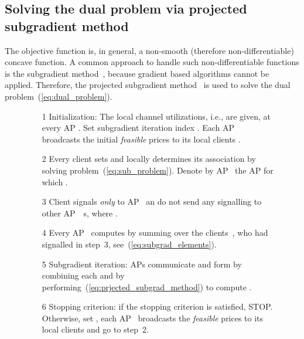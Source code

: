 \documentclass[journal, 10pt, twocolumn]{IEEEtran}
\begin{document}
\subsection{Solving the dual problem via projected subgradient method}\label{subsec:soln}
The objective function  is, in general, a non-smooth (therefore non-differentiable) concave function. A common approach to handle such non-differentiable functions is the subgradient method~\cite{Boyd-EE364b-SubGradMethods-07}, because gradient based algorithms cannot be applied. Therefore, the projected subgradient method~\cite{Bertsekas-99,Boyd-EE364b-SubGradMethods-07} is used to solve the dual problem~(\ref{eq:dual_problem}).

\begin{figure}[t]
\noindent {}
\begin{enumerate}
\scriptsize
\item[1] Initialization: The local channel utilizations, i.e.,  are given, at every AP . Set subgradient iteration index . Each AP~ broadcasts the initial \emph{feasible} prices  to its local clients .


\item[2] Every client  sets  and locally determines its association by solving problem~(\ref{eq:sub_problem}). Denote by AP~ the AP for which . 

\item[3] Client  signals \emph{only} to AP~ an do not send any signalling to other AP~~s, where .

\item[4] Every AP~ computes  by summing  over the clients~, who had signalled in step~3, see~(\ref{eq:subgrad_elements}).

\item[5] Subgradient iteration: APs communicate and form  by combining each  and by performing~(\ref{eq:prjected_subgrad_method}) to compute .

\item[6] Stopping criterion: if the stopping criterion is satisfied, STOP. Otherwise, set , each AP~ broadcasts the \emph{feasible} prices  to its local clients  and go to step~2.
\end{enumerate}
\vspace{-3mm}
\noindent\hrulefill\vspace{-6mm}
\end{figure}
\end{document}
